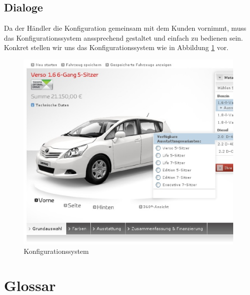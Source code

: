 \documentclass[a4paper,10pt,left=1.5cm,right=1.5cm,top=1.5cm,bottom=1.5cm]{article}
\begin{document}
\subsection{Dialoge}

Da der Händler die Konfiguration gemeinsam mit dem Kunden vornimmt, muss das Konfigurationssystem anssprechend gestaltet und einfach zu bedienen sein.
Konkret stellen wir uns das Konfigurationssystem wie in Abbildung \ref{konfigurator} vor.

\begin{figure}[htb]
 \begin{center}
\hspace*{-7cm}
   \includegraphics[width=1\textwidth]{dialog_config.eps}
    \caption{Konfigurationssystem}
    \label{konfigurator}
  \end{center}
\end{figure}

\section{Glossar}
\end{document}
